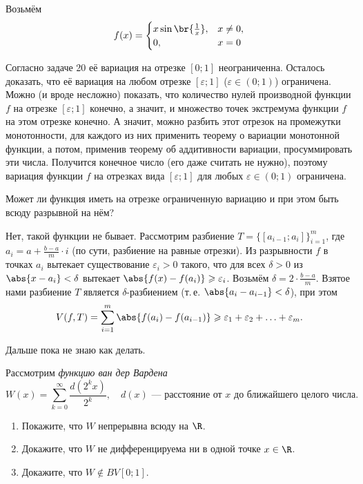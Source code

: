 \begin{solution}
    Возьмём
    \[
        f(x) =
        \begin{cases}
            x\sin\br{\frac{1}{x}},&x \ne 0,\\
            0,&x = 0
        \end{cases}
    \]

    Согласно задаче 20 её вариация на отрезке $[0; 1]$ неограниченна. Осталось доказать, что её вариация на любом отрезке $[\varepsilon; 1]$ ($\varepsilon \in (0; 1)$) ограничена. Можно (и вроде несложно) показать, что количество нулей производной функции $f$ на отрезке $[\varepsilon; 1]$ конечно, а значит, и множество точек экстремума функции $f$ на этом отрезке конечно. А значит, можно разбить этот отрезок на промежутки монотонности, для каждого из них применить теорему о вариации монотонной функции, а потом, применив теорему об аддитивности вариации, просуммировать эти числа. Получится конечное число (его даже считать не нужно), поэтому вариация функции $f$ на отрезках вида $[\varepsilon; 1]$ для любых $\varepsilon \in (0; 1)$ ограничена.
\end{solution}

\begin{problem}[28]
    Может ли функция иметь на отрезке ограниченную вариацию и при этом быть всюду разрывной на нём?
\end{problem}

\begin{solution}
    Нет, такой функции не бывает. Рассмотрим разбиение $T = \{[a_{i - 1}; a_i]\}_{i = 1}^m$, где $a_i = a + \frac{b - a}{m} \cdot i$ (по сути, разбиение на равные отрезки). Из разрывности $f$ в точках $a_i$ вытекает существование $\varepsilon_i > 0$ такого, что для всех $\delta > 0$ из $\abs{x - a_i} < \delta$ вытекает $\abs{f(x) - f(a_i)} \geqslant \varepsilon_i$. Возьмём $\delta = 2 \cdot \frac{b - a}{m}$. Взятое нами разбиение $T$ является $\delta$-разбиением (т.\,е. $\abs{a_i - a_{i - 1}} < \delta$), при этом
    \[
        V(f, T) = \sum_{i = 1}^m\abs{f(a_i) - f(a_{i - 1})} \geqslant \varepsilon_1 + \varepsilon_2 + \ldots + \varepsilon_m.
    \]

    Дальше пока не знаю как делать.
\end{solution}

\begin{problem}[29]
    Рассмотрим \textit{функцию ван дер Вардена}
    \[
        W(x) = \sum_{k = 0}^\infty\frac{d(2^kx)}{2^k},\quad \text{$d(x)$ --- расстояние от $x$ до ближайшего целого числа.}
    \]
    \begin{enumerate}[nolistsep]
        \item Покажите, что $W$ непрерывна всюду на $\R$.
        \item Докажите, что $W$ не дифференцируема ни в одной точке $x \in \R$.
        \item Докажите, что $W \notin BV[0; 1]$.
    \end{enumerate}
\end{problem}

